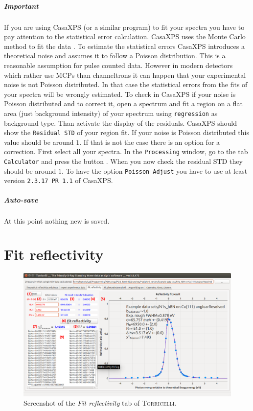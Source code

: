 \documentclass[oldfontcommands,openany,oneside]{memoir}
\begin{document}
\parbox{0.9\linewidth}{\paragraph{Important} If you are using CasaXPS (or a similar program) to fit your spectra you have to pay attention to the statistical error calculation. CasaXPS uses the Monte Carlo method to fit the data \cite{Mercurio2013}. To estimate the statistical errors CasaXPS introduces a theoretical noise and assumes it to follow a Poisson distribution. This is a reasonable assumption for pulse counted data. However in modern detectors which rather use MCPs than channeltrons it can happen that your experimental noise is not Poisson distributed. In that case the statistical errors from the fits of your spectra will be wrongly estimated. To check in CasaXPS if your noise is Poisson distributed and to correct it, open a spectrum and fit a region on a flat area (just background intensity) of your spectrum using \texttt{regression} as background type. Than activate the display of the residuals. CasaXPS should show the \texttt{Residual STD} of your region fit. If your noise is Poisson distributed this value should be around $1$. If that is not the case there is an option for a correction. First select all your spectra. In the \texttt{Processing} window, go to the tab \texttt{Calculator} and press the button . When you now check the residual STD they should be around $1$. To have the option \texttt{Poisson Adjust} you have to use at least version \texttt{2.3.17 PR 1.1} of CasaXPS.}


  \paragraph{Auto-save} At this point nothing new is saved. 


\chapter{Fit reflectivity} \label{chap:FitRefl}
\begin{figure}[!b]
  \centering
  \includegraphics[width=1.2\textwidth]{img/Screenshot_FitRefl.pdf}
  \caption{Screenshot of the \emph{Fit reflectivity} tab of \textsc{Torricelli}.}
  \label{fig:refl}
\end{figure}
\end{document}
